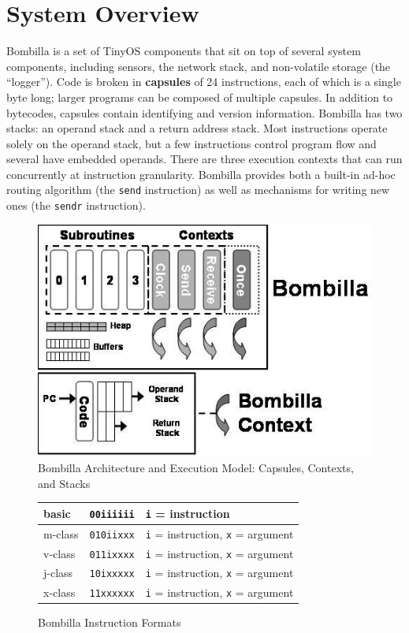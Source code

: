 \documentclass[10pt]{article}
\begin{document}
\section{System Overview}

Bombilla is a set of TinyOS components that sit on top of several
system components, including sensors, the network stack, and
non-volatile storage (the ``logger''). Code is broken in {\bf
capsules} of 24 instructions, each of which is a single byte long;
larger programs can be composed of multiple capsules. In addition to
bytecodes, capsules contain identifying and version
information. Bombilla has two stacks: an operand stack and a return
address stack. Most instructions operate solely on the operand stack,
but a few instructions control program flow and several have embedded
operands. There are three execution contexts that can run concurrently
at instruction granularity. Bombilla provides both a built-in ad-hoc
routing algorithm (the {\tt send} instruction) as well as mechanisms
for writing new ones (the {\tt sendr} instruction).

\begin{figure}
\centering
\includegraphics[scale=0.4]{fig/bombillamodel.jpg}
\caption{Bombilla Architecture and Execution Model: Capsules, Contexts, and Stacks}
\label{fig:exec}
\end{figure}


\begin{figure}
\begin{center}
\def\W{3.25in}

\begin{tabular}{|l|l|l|}\hline
basic   &{\tt 00iiiiii} & {\tt i} = instruction\\ \hline
m-class &{\tt 010iixxx} & {\tt i} = instruction, {\tt x} = argument \\ \hline
v-class &{\tt 011ixxxx} & {\tt i} = instruction, {\tt x} = argument \\ \hline
j-class &{\tt 10ixxxxx} & {\tt i} = instruction, {\tt x} = argument \\ \hline
x-class &{\tt 11xxxxxx} & {\tt i} = instruction, {\tt x} = argument\\ \hline
\end{tabular}

\caption{Bombilla Instruction Formats}
\label{fig:instr}
\end{center}
\end{figure}
\end{document}
